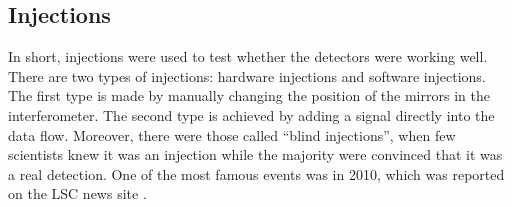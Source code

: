 \documentclass[aps,prd,preprint]{revtex4}
\begin{document}
\subsection{Injections}
In short, injections were used to test whether the detectors were working well. There are two types of injections: hardware injections and software injections. The first type is made by manually changing the position of the mirrors in the interferometer. The second type is achieved by adding a signal directly into the data flow. Moreover, there were those called \enquote{blind injections}, when few scientists knew it was an injection while the majority were convinced that it was a real detection. One of the most famous events was in 2010, which was reported on the LSC news site \cite{blindInj}.
\end{document}
